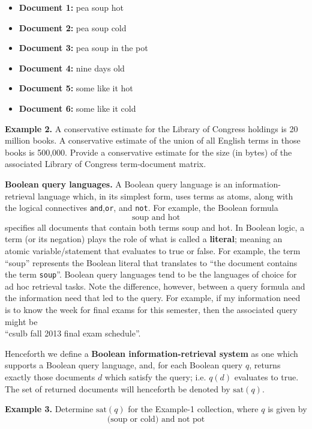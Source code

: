 \documentclass [12pt]{article}
\begin{document}
\begin{itemize}
\item \textbf{Document 1:} pea soup hot
\item \textbf{Document 2:} pea soup cold
\item \textbf{Document 3:} pea soup in the pot
\item \textbf{Document 4:} nine days old
\item \textbf{Document 5:} some like it hot
\item \textbf{Document 6:} some like it cold
\end{itemize}


\vspace{4.0in}
\textbf{Example 2.} A conservative estimate for the Library of Congress holdings is 
20 million books. A conservative estimate of the union of all English terms in those books
is 500,000. Provide a conservative estimate for the size (in bytes) of the associated 
Library of Congress term-document matrix. 



\newpage
\noindent
\textbf{Boolean query languages.} A Boolean query language is an information-retrieval
language which, in its simplest form, uses terms as atoms, along with the logical connectives
\texttt{and},\texttt{or}, and \texttt{not}. For example, the Boolean formula
\[\mbox{soup and hot}\]
specifies all documents that contain both terms soup and hot. In Boolean logic, a term 
(or its negation) plays 
the role of what is called a \textbf{literal}; meaning an atomic variable/statement that evaluates 
to true or false. For example, the term ``soup'' represents the Boolean literal 
that translates to ``the document contains the term \texttt{soup}''.
Boolean query languages tend to 
be the languages of choice for ad hoc retrieval tasks. Note the difference, however, between
a query formula and the information need that led to the query. For example, if my information 
need is to know the week for final exams for this semester, then the associated query might 
be\\ ``csulb fall 2013 final exam schedule''.

Henceforth we define a \textbf{Boolean information-retrieval system} as one which supports a Boolean query language,
and, for each Boolean query $q$, returns exactly those documents $d$ which satisfy the query; i.e. $q(d)$ evaluates to
true. The set of returned documents will henceforth be denoted by $\mbox{sat}(q)$.

\vspace{0.5in}
\textbf{Example 3.} Determine $\mbox{sat}(q)$ for the Example-1 collection, where $q$ is given by 
\[\mbox{(soup or cold) and not pot}\]
\end{document}
